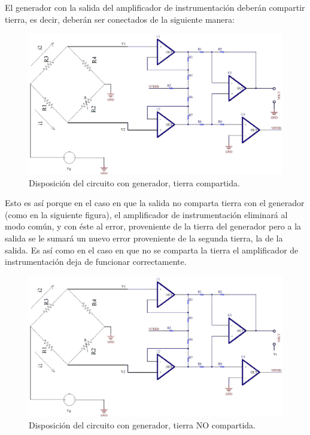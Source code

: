 \documentclass[../../tc_tp3_main.tex]{subfiles}
\begin{document}
El generador con la salida del amplificador de instrumentación deberán compartir tierra, es decir, deberán ser conectados de la siguiente manera:

	\begin{figure}[H]	
		\centering
		\includegraphics[scale=0.3]{imagenes/tierra_amp.png}
		\caption{Disposición del circuito con generador, tierra compartida.}
		\label{fig:ej5_tierra_amp}
	\end{figure}

Esto es así porque en el caso en que la salida no comparta tierra con el generador (como en la siguiente figura), el amplificador de instrumentación eliminará al modo común, y con éste al error, proveniente de la tierra del generador pero a la salida se le sumará un nuevo error proveniente de la segunda tierra, la de la salida. Es así como en el caso en que no se comparta la tierra el amplificador de instrumentación deja de funcionar correctamente.\par

	\begin{figure}[H]	
		\centering
		\includegraphics[scale=0.3]{imagenes/no_tierra_amp.png}
		\caption{Disposición del circuito con generador, tierra NO compartida.}
		\label{fig:ej5_no_tierra_amp}
	\end{figure}
	
\end{document}
